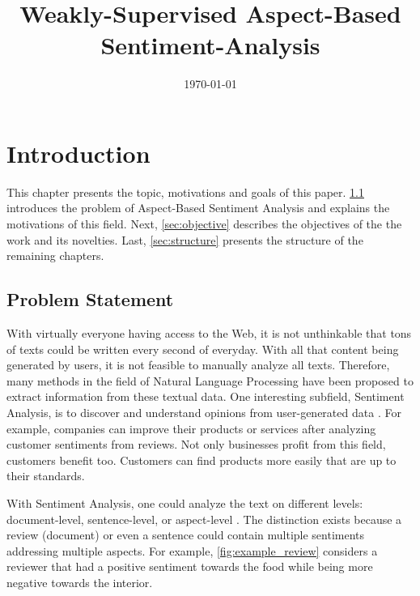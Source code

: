\documentclass[american, oneside]{ecsgdp}
\begin{document}
\frontmatter
\title{Weakly-Supervised Aspect-Based Sentiment-Analysis}
\addresses{\groupname\\\deptname\\\univname}
\date{\today}

% 

\maketitle

\tableofcontents

\mainmatter
\chapter{Introduction} \label{chap:introduction}
This chapter presents the topic, motivations and goals of this paper. \cref{sec:problem} introduces the problem of Aspect-Based Sentiment Analysis and explains the motivations of this field. Next, \cref{sec:objective} describes the objectives of the the work and its novelties. Last, \cref{sec:structure} presents the structure of the remaining chapters. %

\section{Problem Statement} \label{sec:problem}
With virtually everyone having access to the Web, it is not unthinkable that tons of texts could be written every second of everyday. With all that content being generated by users, it is not feasible to manually analyze all texts. Therefore, many methods in the field of Natural Language Processing have been proposed to extract information from these textual data. One interesting subfield, Sentiment Analysis, is to discover and understand opinions from user-generated data \parencite{Liu2012SAOP}. For example, companies can improve their products or services after analyzing customer sentiments from reviews. Not only businesses profit from this field, customers benefit too. Customers can find products more easily that are up to their standards.

With Sentiment Analysis, one could analyze the text on different levels: document-level, sentence-level, or aspect-level \parencite{Liu2012SAOP}. The distinction exists because a review (document) or even a sentence could contain multiple sentiments addressing multiple aspects. For example, \cref{fig:example_review} considers a reviewer that had a positive sentiment towards the food while being more negative towards the interior.
\end{document}

